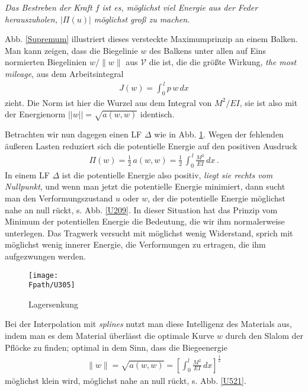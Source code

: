 {{{{{{\em Das Bestreben der Kraft $ f $ ist es, m\"{o}glichst viel Energie aus der Feder herauszuholen, $|\Pi(u)|$ m\"{o}glichst gro{\ss} zu machen\/}.

Abb. \ref{Supremum} illustriert dieses versteckte Maximumprinzip an einem Balken. Man kann zeigen, dass die Biegelinie $w$ des Balkens unter allen auf Eins normierten Biegelinien $w/\|w\|$ aus $\mathcal{V}$ die ist, die die gr\"{o}{\ss}te Wirkung, {\em the most mileage\/}, aus dem Arbeitsintegral
\begin{align}
J(w) = \int_0^{\,l} p\,w\,dx
\end{align}
zieht. Die Norm ist hier die Wurzel aus dem Integral von $M^2/EI$, sie ist also mit der Energienorm $||w|| = \sqrt{a(w,w)}$ identisch.

Betrachten wir nun dagegen einen LF $\Delta$ wie in Abb. \ref{U305}. Wegen der fehlenden \"{a}u{\ss}eren Lasten reduziert sich die potentielle Energie auf den positiven Ausdruck
\begin{align}
\Pi(w)= \frac{1}{2}\,a(w,w) = \frac{1}{2}\, \int_0^{\,l} \frac{M^2}{EI}\,dx\,.
\end{align}
In einem LF $\Delta$ ist die potentielle Energie also positiv, {\em liegt sie rechts vom Nullpunkt\/}, und wenn man jetzt die potentielle Energie minimiert, dann sucht man den Verformungszustand $ u $ oder $w$, der die potentielle Energie m\"{o}glichst nahe an null r\"{u}ckt, s. Abb. \ref{U209}. In dieser Situation hat das Prinzip vom Minimum der potentiellen Energie die Bedeutung, die wir ihm normalerweise unterlegen. Das Tragwerk versucht mit m\"{o}glichst wenig Widerstand, sprich mit m\"{o}glichst wenig innerer Energie, die Verformungen zu ertragen, die ihm aufgezwungen werden.
\begin{figure}[tbp]
\centering
\if {} \sidecaption \fi
\texttt{[image: \\Fpath/U305]}
\caption{Lagersenkung }
\label{U305}
\end{figure}%

Bei der Interpolation mit {\em splines\/} nutzt man diese Intelligenz des Materials aus, indem man es dem Material \"{u}berl\"{a}sst die optimale Kurve $w$ durch den Slalom der Pfl\"{o}cke zu finden; optimal in dem Sinn, dass die Biegeenergie
\begin{align}
\|w\| = \sqrt{a(w,w)} = \left[ \int_{0}^{l}\frac{M^2}{EI}\,dx \right]^{\frac{1}{2}}
\end{align}
m\"{o}glichst klein wird, m\"{o}glichst nahe an null r\"{u}ckt, s. Abb. \ref{U521}.

}}}}}
